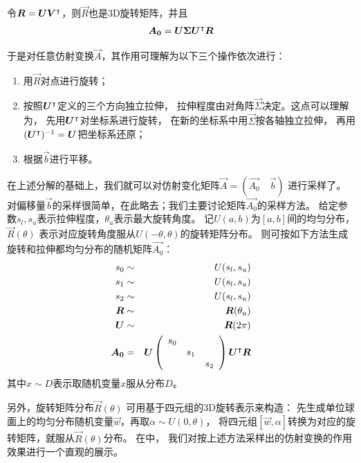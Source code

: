 令$\boldsymbol{R} = \boldsymbol{U}\boldsymbol{V}^\intercal$，则$\vec{R}$也是3D旋转矩阵，并且
\begin{eqnarray}
    \boldsymbol{A_0} = \boldsymbol{U}\boldsymbol{\Sigma}\boldsymbol{U}^\intercal\boldsymbol{R}
    \label{eqn:cnn:affine:a0}
\end{eqnarray}

于是对任意仿射变换$\vec{A}$，其作用可理解为以下三个操作依次进行：
\begin{enumerate}
    \item 用$\vec{R}$对点进行旋转；
    \item 按照$\boldsymbol{U}^\intercal$定义的三个方向独立拉伸，
        拉伸程度由对角阵$\vec{\Sigma}$决定。这点可以理解为，
        先用$\boldsymbol{U}^\intercal$对坐标系进行旋转，
        在新的坐标系中用$\vec{\Sigma}$按各轴独立拉伸，
        再用$(\boldsymbol{U}^\intercal)^{-1}=\boldsymbol{U}$把坐标系还原；
    \item 根据$\vec{b}$进行平移。
\end{enumerate}

在上述分解的基础上，我们就可以对仿射变化矩阵$\vec{A} = (\vec{A_0}\quad\vec{b})$
进行采样了。
对偏移量$\vec{b}$的采样很简单，在此略去；我们主要讨论矩阵$\vec{A_0}$的采样方法。
给定参数$s_l, s_u$表示拉伸程度，$\theta_u$表示最大旋转角度。
记$U(a, b)$为$[a, b]$间的均匀分布，
$\vec{R}(\theta)$
表示对应旋转角度服从$U(-\theta, \theta)$的旋转矩阵分布。
则可按如下方法生成旋转和拉伸都均匀分布的随机矩阵$\vec{A_0}$：
\begin{eqnarray}
    s_0 &\sim& U(s_l, s_u) \nonumber \\
    s_1 &\sim& U(s_l, s_u) \nonumber \\
    s_2 &\sim& U(s_l, s_u) \nonumber \\
    \boldsymbol{R} &\sim& \boldsymbol{R}(\theta_u) \nonumber \\
    \boldsymbol{U} &\sim& \boldsymbol{R}(2\pi) \nonumber \\
    \boldsymbol{A_0} &=&  \boldsymbol{U}\left(\begin{array}{ccc}
        s_0 & & \\
        & s_1 & \\
        & & s_2
    \end{array}\right)\boldsymbol{U}^\intercal\boldsymbol{R}
\end{eqnarray}
其中$x\sim D$表示取随机变量$x$服从分布$D$。

另外，旋转矩阵分布$\vec{R}(\theta)$
可用基于四元组的3D旋转表示\cite{kuipers1999quaternions}来构造：
先生成单位球面上的均匀分布随机变量$\vec{w}$，再取$\alpha \sim U(0, \theta)$，
将四元组$[\vec{w}, \alpha]$转换为对应的旋转矩阵，就服从$\vec{R}(\theta)$分布。
在中，
我们对按上述方法采样出的仿射变换的作用效果进行一个直观的展示。


